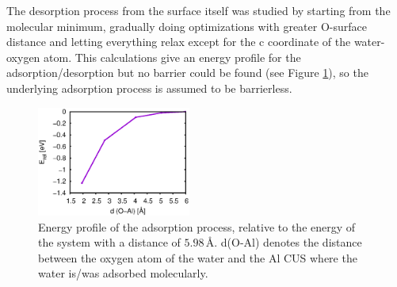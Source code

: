 \documentclass[11pt,DIV=13,BCOR=5mm,a4paper,headinclude]{scrbook}
\begin{document}
The desorption process from the surface itself was studied by starting from the molecular minimum, gradually doing optimizations with greater O-surface distance and letting everything relax except for the c coordinate of the water-oxygen atom.
This calculations give an energy profile for the adsorption/desorption but no barrier could be found (see Figure \ref{abb:0001_desorption}), so the underlying adsorption process is assumed to be barrierless.
  \begin{figure}[!ht]
   \centering
   \includegraphics[width=0.45\textwidth]{figures/0001/mol_ads_barrier.eps}
   \caption{Energy profile of the adsorption process, relative to the energy of the system with a distance of $5.98\,$\AA.
d(O-Al) denotes the distance between the oxygen atom of the water and the Al CUS where the water is/was adsorbed molecularly.
   }
   \label{abb:0001_desorption}
  \end{figure}

\end{document}

